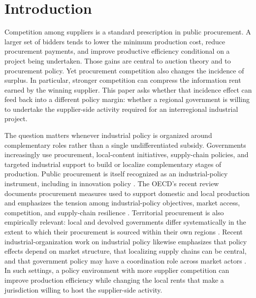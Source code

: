 \section{Introduction}
\label{sec:introduction}

Competition among suppliers is a standard prescription in public procurement. A larger set of bidders tends to lower the minimum production cost, reduce procurement payments, and improve productive efficiency conditional on a project being undertaken. Those gains are central to auction theory and to procurement policy. Yet procurement competition also changes the incidence of surplus. In particular, stronger competition can compress the information rent earned by the winning supplier. This paper asks whether that incidence effect can feed back into a different policy margin: whether a regional government is willing to undertake the supplier-side activity required for an interregional industrial project.

The question matters whenever industrial policy is organized around complementary roles rather than a single undifferentiated subsidy. Governments increasingly use procurement, local-content initiatives, supply-chain policies, and targeted industrial support to build or localize complementary stages of production. Public procurement is itself recognized as an industrial-policy instrument, including in innovation policy \citep{ChiappinelliGiuffridaSpagnolo2025}. The OECD's recent review documents procurement measures used to support domestic and local production and emphasizes the tension among industrial-policy objectives, market access, competition, and supply-chain resilience \citep{OECD2026}. Territorial procurement is also empirically relevant: local and devolved governments differ systematically in the extent to which their procurement is sourced within their own regions \citep{EckersleyEtAl2023}. Recent industrial-organization work on industrial policy likewise emphasizes that policy effects depend on market structure, that localizing supply chains can be central, and that government policy may have a coordination role across market actors \citep{VanBiesebroeckZhang2026,MottaPolo2026}. In such settings, a policy environment with more supplier competition can improve production efficiency while changing the local rents that make a jurisdiction willing to host the supplier-side activity.

